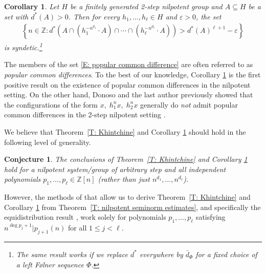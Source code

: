 \documentclass[11pt]{amsart}
\newtheorem{corollary}[lemma]{Corollary}
\newtheorem{conjecture}[lemma]{Conjecture}
\theoremstyle{definition}
\newcommand{\Z}{{\mathbb Z}}
\newcommand{\veps}{\varepsilon}
\newcommand{\1}{{\mathbf{1}}}
\newcommand{\rem}[1]{\left \{ #1 \right \}}
\begin{document}
\begin{corollary}\label{C: popular common differences}
    Let $H$ be a finitely generated 2-step nilpotent group and $A\subseteq H$ be a set with $d^*(A)>0$.
    Then for every $h_1, \ldots, h_\ell\in H$ and $\veps>0$, the set
        \begin{align}\label{E: popular common difference}
    \rem{n\in\Z\colon d^*(A\cap (h_1^{-n^{d_1}}\cdot A)\cap \cdots \cap (h_\ell^{-n^{d_\ell}}\cdot A))>d^*(A)^{\ell+1}-\veps}
\end{align}
is syndetic.\footnote{The same result works if we replace $d^*$ everywhere by $\bar d_\Phi$ for a fixed choice of a left F{\o}lner sequence $\Phi$.}
\end{corollary}

The members of the set \eqref{E: popular common difference} are often referred to as \textit{popular common differences}. To the best of our knowledge, Corollary \ref{C: popular common differences} is the first positive result on the existence of popular common differences in the nilpotent setting. On the other hand, Donoso and the last author previously showed that the configurations of the form $x,\; h_1^nx,\; h_2^n x$ generally do \textit{not} admit popular common differences in the 2-step nilpotent setting \cite{DS18}.

We believe that Theorem~\ref{T: Khintchine} and Corollary \ref{C: popular common differences} should hold in the following level of generality.
\begin{conjecture}\label{Conj: popular common differences}
    The conclusions of Theorem~\ref{T: Khintchine} and Corollary \ref{C: popular common differences} hold for a nilpotent system/group of arbitrary step and all independent polynomials $p_1, \ldots, p_\ell\in\Z[n]$ (rather than  just $n^{d_1}, \ldots, n^{d_\ell}$).
\end{conjecture}
However, the methods of \cite{CFH11} that allow us to derive Theorem~\ref{T: Khintchine} and Corollary \ref{C: popular common differences} from Theorem~\ref{T: nilpotent seminorm estimates}, and specifically the equidistribution result \cite[Lemma~7.6]{CFH11}, work solely for polynomials $p_1, \ldots, p_\ell$ satisfying $n^{\deg p_j +1}|p_{j+1}(n)$ for all $1\leq j<\ell$. 
\end{document}
